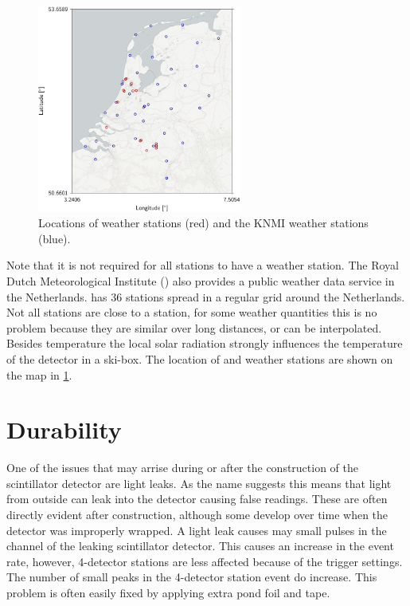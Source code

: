 \begin{figure}
    \centering
    \includegraphics[width=0.6\textwidth]
                    {plots/station/map_weather_knmi}
    \caption{Locations of \hisparc weather stations (red) and the KNMI weather stations (blue).}
    \label{fig:map_weather_knmi}
\end{figure}

Note that it is not required for all stations to have a weather station. The Royal Dutch Meteorological Institute (\knmi) also provides a public weather data service in the Netherlands. \knmi has 36 stations spread in a regular grid around the Netherlands. Not all \hisparc stations are close to a \knmi station, for some weather quantities this is no problem because they are similar over long distances, or can be interpolated. Besides temperature the local solar radiation strongly influences the temperature of the detector in a ski-box. The location of \hisparc and \knmi weather stations are shown on the map in \cref{fig:map_weather_knmi}.


\section{Durability}
\label{sec:detector-durability}

One of the issues that may arrise during or after the construction of the scintillator detector are light leaks. As the name suggests this means that light from outside can leak into the detector causing false readings. These are often directly evident after construction, although some develop over time when the detector was improperly wrapped. A light leak causes may small pulses in the channel of the leaking scintillator detector. This causes an increase in the event rate, however, 4-detector stations are less affected because of the trigger settings. The number of small peaks in the 4-detector station event do increase. This problem is often easily fixed by applying extra pond foil and tape.

